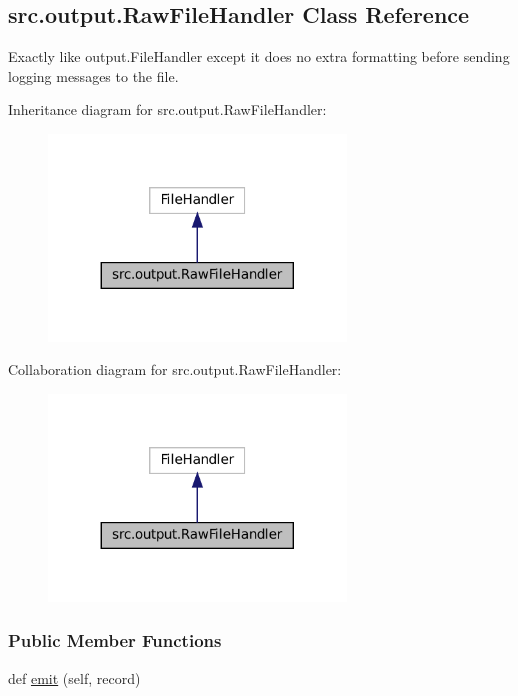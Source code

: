 \hypertarget{classsrc_1_1output_1_1RawFileHandler}{}\subsection{src.\+output.\+Raw\+File\+Handler Class Reference}
\label{classsrc_1_1output_1_1RawFileHandler}


Exactly like output.\+File\+Handler except it does no extra formatting before sending logging messages to the file.  




Inheritance diagram for src.\+output.\+Raw\+File\+Handler\+:
\nopagebreak
\begin{figure}[H]
\begin{center}
\leavevmode
\includegraphics[width=224pt]{classsrc_1_1output_1_1RawFileHandler__inherit__graph}
\end{center}
\end{figure}


Collaboration diagram for src.\+output.\+Raw\+File\+Handler\+:
\nopagebreak
\begin{figure}[H]
\begin{center}
\leavevmode
\includegraphics[width=224pt]{classsrc_1_1output_1_1RawFileHandler__coll__graph}
\end{center}
\end{figure}
\subsubsection*{Public Member Functions}
\begin{DoxyCompactItemize}
\item 
def \hyperlink{classsrc_1_1output_1_1RawFileHandler_aba10676e642163e8e58f083512e65cf1}{emit} (self, record)
\end{DoxyCompactItemize}



